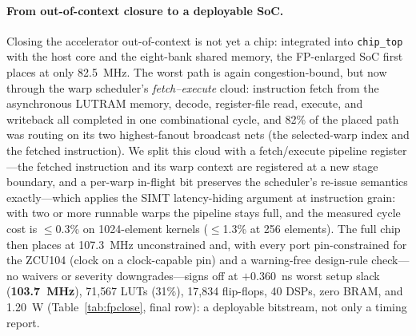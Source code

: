 \documentclass[conference]{IEEEtran}
\begin{document}
\paragraph{From out-of-context closure to a deployable SoC.} Closing the
accelerator out-of-context is not yet a chip: integrated into \texttt{chip\_top}
with the host core and the eight-bank shared memory, the FP-enlarged SoC first
places at only 82.5~MHz. The worst path is again congestion-bound, but now through
the warp scheduler's \emph{fetch--execute} cloud: instruction fetch from the
asynchronous LUTRAM memory, decode, register-file read, execute, and writeback all
completed in one combinational cycle, and 82\% of the placed path was routing on
its two highest-fanout broadcast nets (the selected-warp index and the fetched
instruction). We split this cloud with a fetch/execute pipeline register---the
fetched instruction and its warp context are registered at a new stage boundary,
and a per-warp in-flight bit preserves the scheduler's re-issue semantics
exactly---which applies the SIMT latency-hiding argument at instruction grain:
with two or more runnable warps the pipeline stays full, and the measured cycle
cost is $\le$0.3\% on 1024-element kernels ($\le$1.3\% at 256 elements). The full
chip then places at 107.3~MHz unconstrained and, with every port pin-constrained
for the ZCU104 (clock on a clock-capable pin) and a warning-free design-rule
check---no waivers or severity downgrades---signs off at $+0.360$~ns worst setup
slack (\textbf{103.7~MHz}), 71{,}567 LUTs (31\%), 17{,}834 flip-flops, 40 DSPs,
zero BRAM, and 1.20~W (Table~\ref{tab:fpclose}, final row): a deployable
bitstream, not only a timing report.
\end{document}
